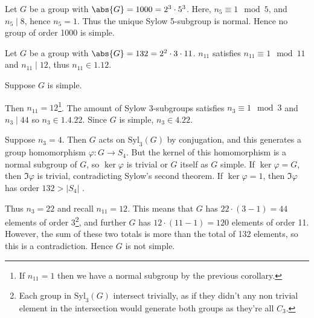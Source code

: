 \begin{example}
	Let $G$ be a group with $\abs{G} = 1000 = 2^3 \cdot 5^3$.
	Here, $n_5 \equiv 1 \mod 5$, and $n_5 \mid 8$, hence $n_5 = 1$.
	Thus the unique Sylow 5-subgroup is normal.
	Hence no group of order 1000 is simple.
\end{example}

\begin{example}
	Let $G$ be a group with $\abs{G} = 132 = 2^2 \cdot 3 \cdot 11$.
	$n_{11}$ satisfies $n_{11} \equiv 1 \mod 11$ and $n_{11} \mid 12$, thus $n_{11} \in \qty{1, 12}$.

	Suppose $G$ is simple.

	Then $n_{11} = 12$\footnote{If $n_{11} = 1$ then we have a normal subgroup by the previous corollary.}.
	The amount of Sylow 3-subgroups satisfies $n_3 \equiv 1 \mod 3$ and $n_3 \mid 44$ so $n_3 \in \qty{1, 4, 22}$.
	Since $G$ is simple, $n_3 \in \qty{4, 22}$.

	Suppose $n_3 = 4$.
	Then $G$ acts on $\mathrm{Syl}_3(G)$ by conjugation, and this generates a group homomorphism $\varphi \colon G \to S_4$.
	But the kernel of this homomorphism is a normal subgroup of $G$, so $\ker \varphi$ is trivial or $G$ itself as $G$ simple.
	If $\ker \varphi = G$, then $\Im \varphi$ is trivial, contradicting Sylow's second theorem.
	If $\ker \varphi = 1$, then $\Im \varphi$ has order $132 > |S_4|$ \Lightning.

	Thus $n_3 = 22$ and recall $n_{11} = 12$.
	This means that $G$ has $22 \cdot (3-1) = 44$ elements of order 3\footnote{Each group in $\mathrm{Syl}_3(G)$ intersect trivially, as if they didn't any non trivial element in the intersection would generate both groups as they're all $C_3$.}, and further $G$ has $12 \cdot (11 - 1) = 120$ elements of order 11.
	However, the sum of these two totals is more than the total of 132 elements, so this is a contradiction.
	Hence $G$ is not simple.
\end{example}

